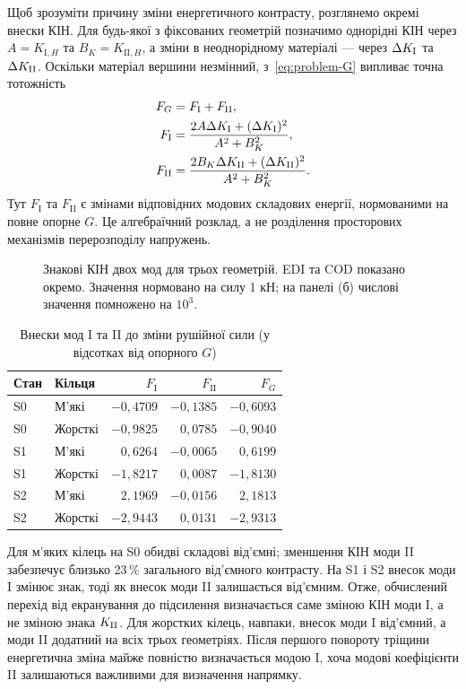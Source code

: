 Щоб зрозуміти причину зміни енергетичного контрасту, розглянемо окремі внески КІН. Для будь-якої з фіксованих геометрій позначимо однорідні КІН через $A=K_{\mathrm I,H}$ та $B_K=K_{\mathrm{II},H}$, а зміни в неоднорідному матеріалі --- через $\Delta K_{\mathrm{I}}$ та $\Delta K_{\mathrm{II}}$. Оскільки матеріал вершини незмінний, з~\eqref{eq:problem-G} випливає точна тотожність
\begin{equation}
 \begin{aligned}
 F_G={}&F_{\mathrm I}+F_{\mathrm{II}},\\
 F_{\mathrm I}={}&\frac{2A\Delta K_{\mathrm{I}}+(\Delta K_{\mathrm{I}})^2}{A^2+B_K^2},\\
 F_{\mathrm{II}}={}&\frac{2B_K\Delta K_{\mathrm{II}}+(\Delta K_{\mathrm{II}})^2}{A^2+B_K^2}.
 \end{aligned}
 \label{eq:fixed-mode-decomp}
\end{equation}
Тут $F_{\mathrm I}$ та $F_{\mathrm{II}}$ є змінами відповідних модових складових енергії, нормованими на повне опорне $G$. Це алгебраїчний розклад, а не розділення просторових механізмів перерозподілу напружень.

\begin{figure}[htbp]
 \centering
 
 \caption{Знакові КІН двох мод для трьох геометрій. EDI та COD показано окремо. Значення нормовано на силу 1 кН; на панелі (б) числові значення помножено на $10^3$.}
 \label{fig:fixed-K}
\end{figure}

\begin{table}[htbp]
 \centering
 \caption{Внески мод I та II до зміни рушійної сили (у відсотках від опорного $G$)}
 \label{tab:fixed-modes}
 \begin{tabular}{llrrr}
 \toprule
 Стан & Кільця & $F_{\mathrm I}$ & $F_{\mathrm{II}}$ & $F_G$\\
 \midrule
S0 & М'які & $-0,4709$ & $-0,1385$ & $-0,6093$ \\
S0 & Жорсткі & $-0,9825$ & $0,0785$ & $-0,9040$ \\
S1 & М'які & $0,6264$ & $-0,0065$ & $0,6199$ \\
S1 & Жорсткі & $-1,8217$ & $0,0087$ & $-1,8130$ \\
S2 & М'які & $2,1969$ & $-0,0156$ & $2,1813$ \\
S2 & Жорсткі & $-2,9443$ & $0,0131$ & $-2,9313$ \\
 \bottomrule
 \end{tabular}
\end{table}

Для м'яких кілець на S0 обидві складові від'ємні; зменшення КІН моди II забезпечує близько 23\,\% загального від'ємного контрасту. На S1 і S2 внесок моди I змінює знак, тоді як внесок моди II залишається від'ємним. Отже, обчислений перехід від екранування до підсилення визначається саме зміною КІН моди I, а не зміною знака $K_{\mathrm{II}}$. Для жорстких кілець, навпаки, внесок моди I від'ємний, а моди II додатний на всіх трьох геометріях. Після першого повороту тріщини енергетична зміна майже повністю визначається модою I, хоча модові коефіцієнти II залишаються важливими для визначення напрямку.

